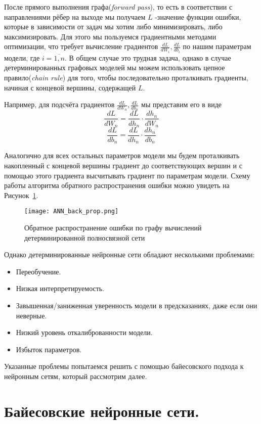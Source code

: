 После прямого выполнения графа(\textit{forward pass}), то есть в соответствии с направлениями рёбер на выходе мы получаем
 $L$ -значение функции ошибки, которые в зависимости от задач мы хотим либо минимизировать, либо максимизировать. Для этого
 мы пользуемся градиентными методами оптимизации, что требует вычисление градиентов $\frac{dL}{d W_i}, \frac{dL}{d b_i}$ по нашим параметрам модели, где $i = \overline{1,n}$.
 В общем случае это трудная задача, однако в случае детерминированных графовых моделей мы можем использовать цепное правило(\textit{chain rule}) для того, чтобы последовательно
 проталкивать градиенты, начиная с концевой вершины, содержащей $L$.

 Например, для подсчёта градиентов $\frac{dL}{d W_n}, \frac{dL}{d b_n}$ мы представим его в виде
 $$\frac{dL}{d W_n} = \frac{dL}{d h_n} \cdot \frac{d h_n}{d W_n}$$
 $$\frac{dL}{d b_n} = \frac{dL}{d h_n} \cdot \frac{d h_n}{d b_n}$$

Аналогично для всех остальных параметров модели мы будем проталкивать накопленный с концевой вершины градиент до соответствующих вершин и
 с помощью этого градиента высчитывать градиент по параметрам модели. Схему работы алгоритма обратного распространения ошибки
 можно увидеть на Рисунок~\ref{fig:ANN_back_prop}.
\begin{figure}[H]
    \centering
    \texttt{[image: ANN\_back\_prop.png]}
    \caption{Обратное распространение ошибки по графу вычислений детерминированной полносвязной сети}
    \label{fig:ANN_back_prop}
\end{figure}

Однако детерминированные нейронные сети обладают несколькими проблемами:
\begin{itemize}
    \item Переобучение.
    \item Низкая интерпретируемость.
    \item Завышенная/заниженная уверенность модели в предсказаниях, даже если они неверные.
    \item Низкий уровень откалиброванности модели.
    \item Избыток параметров.
\end{itemize}

Указанные проблемы попытаемся решить с помощью байесовского подхода к нейронным сетям, который
 рассмотрим далее.

\section{Байесовские нейронные сети.}
